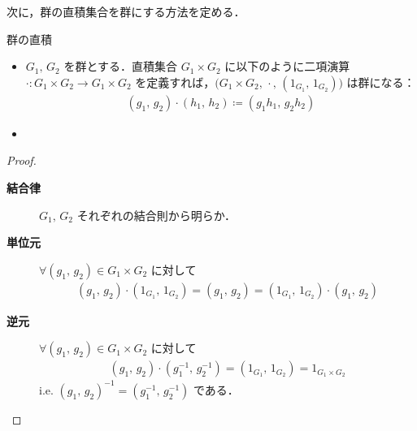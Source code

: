 \documentclass[geometry_main]{subfiles}
\begin{document}
次に，群の直積集合を群にする方法を定める．
\begin{mydef}[label=def:prod-group]{群の直積}
	\begin{itemize}
		\item $G_1,\, G_2$ を群とする．直積集合 $G_1 \times G_2$ に以下のように二項演算 $\cdot \mathrel{} \colon G_1 \times G_2 \to G_1 \times G_2$ を定義すれば，$\bigl( G_1 \times G_2,\, \cdot \mathrel{},\, (1_{G_1},\, 1_{G_2}) \bigr)$ は群になる：
		\begin{align}
			(g_1,\, g_2) \cdot (h_1,\, h_2) \coloneqq (g_1h_1,\, g_2h_2)
		\end{align}
		\item 
	\end{itemize}
\end{mydef}
\begin{proof}
	\begin{description}
		\item[\textbf{結合律}] $G_1,\, G_2$ それぞれの結合則から明らか．
		\item[\textbf{単位元}] $\forall (g_1,\, g_2) \in G_1 \times G_2$ に対して
		\begin{align}
			(g_1,\, g_2) \cdot (1_{G_1},\, 1_{G_2}) = (g_1,\, g_2) =  (1_{G_1},\, 1_{G_2})\cdot (g_1,\, g_2)
		\end{align}
		\item[\textbf{逆元}] $\forall (g_1,\, g_2) \in G_1 \times G_2$ に対して
		\begin{align}
			(g_1,\, g_2) \cdot (g_1^{-1},\, g_2^{-1}) = (1_{G_1},\, 1_{G_2}) = 1_{G_1 \times G_2}
		\end{align}
		i.e. $(g_1,\, g_2)^{-1} = (g_1^{-1},\, g_2^{-1})$ である．
	\end{description}
\end{proof}
\end{document}
